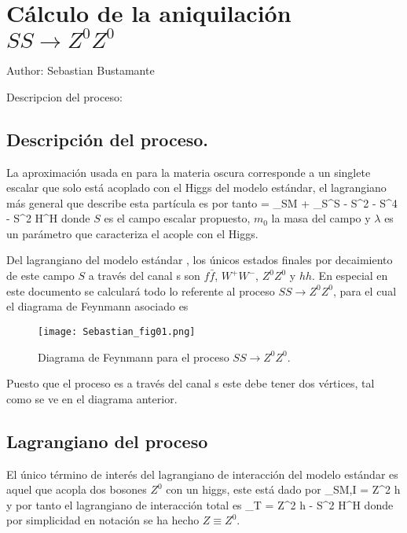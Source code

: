 \chapter{Cálculo de la aniquilación $SS\rightarrow Z^0Z^0$}
Author: Sebastian Bustamante

Descripcion del proceso: 

\section{Descripción del proceso.}

La aproximación usada en \cite{Goud} para la materia oscura corresponde a un singlete escalar que solo está acoplado con el Higgs del modelo estándar, el lagrangiano más general que describe esta partícula es por tanto
{  = _{SM} + \partial_\mu S\partial^\mu S - S^2 - S^4 - \lambda S^2 H^\dag H }
donde $S$ es el campo escalar propuesto, $m_0$ la masa del campo y $\lambda$ es un parámetro que caracteriza el acople con el Higgs.

Del lagrangiano del modelo estándar \cite{profe}, los únicos estados finales por decaimiento de este campo $S$ a través del canal s son $f\bar f$, $W^+W^-$, $Z^0Z^0$ y $hh$. En especial en este documento se calculará todo lo referente al proceso $SS\rightarrow Z^0Z^0$, para el cual el diagrama de Feynmann asociado es

\begin{figure}[htbp]
	\centering
	\texttt{[image: Sebastian\_fig01.png]}
	\caption{Diagrama de Feynmann para el proceso $SS\rightarrow Z^0Z^0$.}
	\label{fig:fig01}
\end{figure}

Puesto que el proceso es a través del canal s este debe tener dos vértices, tal como se ve en el diagrama anterior.

\section{Lagrangiano del proceso}

El único término de interés del lagrangiano de interacción del modelo estándar es aquel que acopla dos bosones $Z^0$ con un higgs, este está dado por \cite{profe}
{ _{SM,I} =  Z^2 h }
y por tanto el lagrangiano de interacción total es
{ _{T} =  Z^2 h - \lambda S^2 H^\dag H   }
donde por simplicidad en notación se ha hecho $Z\equiv Z^0$.


